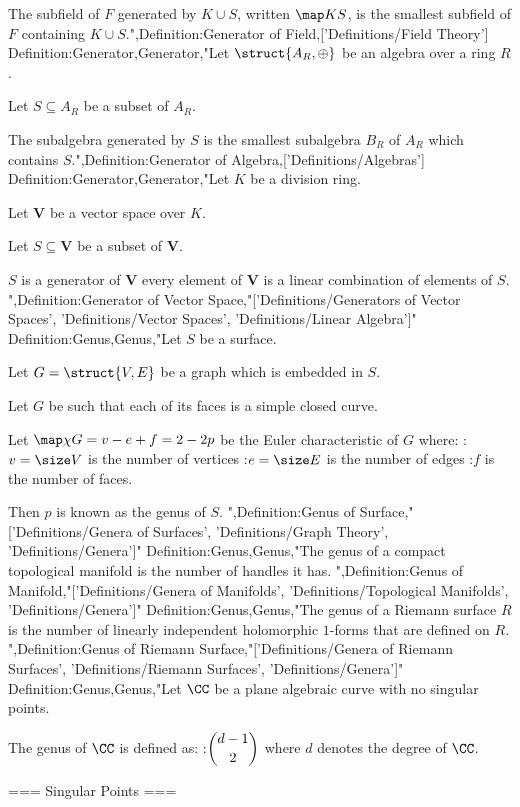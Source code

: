The subfield of $F$ generated by $K \cup S$, written $\map K S$, is the smallest subfield of $F$ containing $K \cup S$.",Definition:Generator of Field,['Definitions/Field Theory']
Definition:Generator,Generator,"Let $\struct {A_R, \oplus}$ be an algebra over a ring $R$.

Let $S \subseteq A_R$ be a subset of $A_R$.


The subalgebra generated by $S$ is the smallest subalgebra $B_R$ of $A_R$ which contains $S$.",Definition:Generator of Algebra,['Definitions/Algebras']
Definition:Generator,Generator,"Let $K$ be a division ring.

Let $\mathbf V$ be a vector space over $K$.

Let $S \subseteq \mathbf V$ be a subset of $\mathbf V$.


$S$ is a generator of $\mathbf V$  every element of $\mathbf V$ is a linear combination of elements of $S$.
",Definition:Generator of Vector Space,"['Definitions/Generators of Vector Spaces', 'Definitions/Vector Spaces', 'Definitions/Linear Algebra']"
Definition:Genus,Genus,"Let $S$ be a surface.

Let $G = \struct {V, E}$ be a graph which is embedded in $S$.

Let $G$ be such that each of its faces is a simple closed curve.

Let $\map \chi G = v - e + f = 2 - 2 p$ be the Euler characteristic of $G$ where:
:$v = \size V$ is the number of vertices
:$e = \size E$ is the number of edges
:$f$ is the number of faces.

Then $p$ is known as the genus of $S$.
",Definition:Genus of Surface,"['Definitions/Genera of Surfaces', 'Definitions/Graph Theory', 'Definitions/Genera']"
Definition:Genus,Genus,"The genus of a compact topological manifold is the number of handles it has.
",Definition:Genus of Manifold,"['Definitions/Genera of Manifolds', 'Definitions/Topological Manifolds', 'Definitions/Genera']"
Definition:Genus,Genus,"The genus of a Riemann surface $R$ is the number of linearly independent holomorphic $1$-forms that are defined on $R$.
",Definition:Genus of Riemann Surface,"['Definitions/Genera of Riemann Surfaces', 'Definitions/Riemann Surfaces', 'Definitions/Genera']"
Definition:Genus,Genus,"Let $\CC$ be a plane algebraic curve with no singular points.

The genus of $\CC$ is defined as:
:$\dbinom {d - 1} 2$
where $d$ denotes the degree of $\CC$.


=== Singular Points ===

